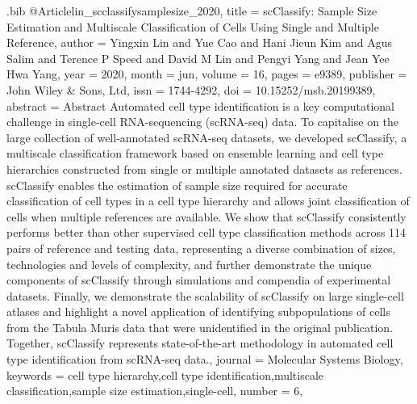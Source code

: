 \documentclass[
  table,
  10pt,
  a4paper]{article}
\begin{document}
\begin{filecontents}{\jobname.bib}
@Article{lin_scclassifysamplesize_2020,
	title = {{{scClassify}}: Sample Size Estimation and Multiscale Classification of Cells Using Single and Multiple Reference},
	author = {Yingxin Lin and Yue Cao and Hani Jieun Kim and Agus Salim and Terence P Speed and David M Lin and Pengyi Yang and Jean Yee Hwa Yang},
	year = {2020},
	month = {jun},
	volume = {16},
	pages = {e9389},
	publisher = {{John Wiley \& Sons, Ltd}},
	issn = {1744-4292},
	doi = {10.15252/msb.20199389},
	abstract = {Abstract Automated cell type identification is a key computational challenge in single-cell RNA-sequencing (scRNA-seq) data. To capitalise on the large collection of well-annotated scRNA-seq datasets, we developed scClassify, a multiscale classification framework based on ensemble learning and cell type hierarchies constructed from single or multiple annotated datasets as references. scClassify enables the estimation of sample size required for accurate classification of cell types in a cell type hierarchy and allows joint classification of cells when multiple references are available. We show that scClassify consistently performs better than other supervised cell type classification methods across 114 pairs of reference and testing data, representing a diverse combination of sizes, technologies and levels of complexity, and further demonstrate the unique components of scClassify through simulations and compendia of experimental datasets. Finally, we demonstrate the scalability of scClassify on large single-cell atlases and highlight a novel application of identifying subpopulations of cells from the Tabula Muris data that were unidentified in the original publication. Together, scClassify represents state-of-the-art methodology in automated cell type identification from scRNA-seq data.},
	journal = {Molecular Systems Biology},
	keywords = {cell type hierarchy,cell type identification,multiscale classification,sample size estimation,single-cell},
	number = {6},
}


\end{filecontents}
\end{document}
